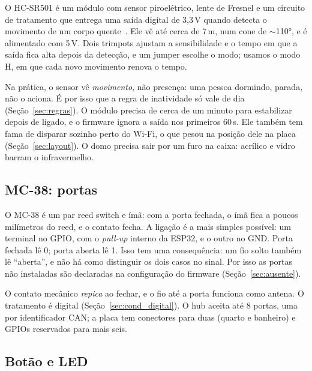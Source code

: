 O HC-SR501 é um módulo com sensor piroelétrico, lente de Fresnel e um circuito de
tratamento que entrega uma saída digital de 3,3\,V quando detecta o movimento de um corpo
quente~\cite{hcsr501}. Ele vê até cerca de 7\,m, num cone de $\sim$110°, e é alimentado com
5\,V. Dois trimpots ajustam a sensibilidade e o tempo em que a saída fica alta depois da
detecção, e um jumper escolhe o modo; usamos o modo H, em que cada novo movimento renova o
tempo.

Na prática, o sensor vê \emph{movimento}, não presença: uma pessoa dormindo, parada, não o
aciona. É por isso que a regra de inatividade só vale de dia
(Seção~\ref{sec:regras}). O módulo precisa de cerca de um minuto para estabilizar depois de
ligado, e o firmware ignora a saída nos primeiros 60\,s. Ele também tem fama de disparar
sozinho perto do Wi-Fi, o que pesou na posição dele na placa (Seção~\ref{sec:layout}). O
domo precisa sair por um furo na caixa: acrílico e vidro barram o infravermelho.

\subsection{MC-38: portas}

O MC-38 é um par reed switch e ímã: com a porta fechada, o ímã fica a poucos
milímetros do reed, e o contato fecha. A ligação é a mais simples possível: um terminal no
GPIO, com o \textit{pull-up} interno da ESP32, e o outro no GND. Porta fechada lê 0; porta
aberta lê 1. Isso tem uma consequência: um fio solto também lê ``aberta'', e não há como
distinguir os dois casos no sinal. Por isso as portas não instaladas são declaradas na
configuração do firmware (Seção~\ref{sec:ausente}).

O contato mecânico \textit{repica} ao fechar, e o fio até a porta funciona como antena. O
tratamento é digital (Seção~\ref{sec:cond_digital}). O hub aceita até 8 portas, uma por
identificador CAN; a placa tem conectores para duas (quarto e banheiro) e GPIOs reservados
para mais seis.

\subsection{Botão e LED}\label{sec:botao}

